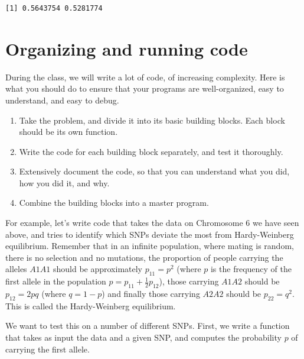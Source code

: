\documentclass[
  letterpaper,
  DIV=11,
  numbers=noendperiod]{scrreprt}
\providecommand{\tightlist}{%
  \setlength{\itemsep}{0pt}\setlength{\parskip}{0pt}}\usepackage{longtable,booktabs,array}
\begin{document}
\begin{verbatim}
[1] 0.5643754 0.5281774
\end{verbatim}

\hypertarget{organizing-and-running-code}{%
\section{Organizing and running
code}\label{organizing-and-running-code}}

During the class, we will write a lot of code, of increasing complexity.
Here is what you should do to ensure that your programs are
well-organized, easy to understand, and easy to debug.

\begin{enumerate}
\def\labelenumi{\arabic{enumi}.}
\tightlist
\item
  Take the problem, and divide it into its basic building blocks. Each
  block should be its own function.
\item
  Write the code for each building block separately, and test it
  thoroughly.
\item
  Extensively document the code, so that you can understand what you
  did, how you did it, and why.
\item
  Combine the building blocks into a master program.
\end{enumerate}

For example, let's write code that takes the data on Chromosome 6 we
have seen above, and tries to identify which SNPs deviate the most from
Hardy-Weinberg equilibrium. Remember that in an infinite population,
where mating is random, there is no selection and no mutations, the
proportion of people carrying the alleles \(A1A1\) should be
approximately \(p_{11} = p^2\) (where \(p\) is the frequency of the
first allele in the population \(p = p_{11} + \frac{1}{2} p_{12}\)),
those carrying \(A1A2\) should be \(p_{12} = 2 p q\) (where \(q = 1-p\))
and finally those carrying \(A2A2\) should be \(p_{22} = q^2\). This is
called the Hardy-Weinberg equilibrium.

We want to test this on a number of different SNPs. First, we write a
function that takes as input the data and a given SNP, and computes the
probability \(p\) of carrying the first allele.
\end{document}

